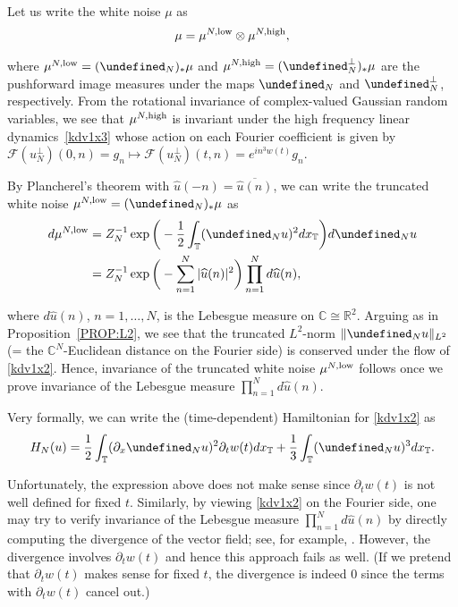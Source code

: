 \documentclass[letterpaper, 11pt,  reqno]{amsart}
\newcommand{\1}{\hspace{0.5mm}\text{I}\hspace{0.5mm}}
\newcommand{\noi}{\noindent}
\newcommand{\R}{\mathbb{R}}
\newcommand{\C}{\mathbb{C}}
\newcommand{\T}{\mathbb{T}}
\let\P= \undefined
\newcommand{\P}{\mathbf{P}}
\newcommand{\F}{\mathcal{F}}
\newcommand{\low}{\textup{low}}
\newcommand{\high}{\textup{high}}
\newcommand{\ft}{\widehat}
\newcommand{\cj}{\overline}
\newcommand{\dx}{\partial_x}
\newcommand{\dt}{\partial_t}
\numberwithin{equation}{section}
\numberwithin{theorem}{section}
\begin{document}
Let us write the white noise $\mu$ as 
\begin{align}
 \mu 
  =  \mu^{N, \low} \otimes \mu^{N, \high}, 
\label{white1b}
\end{align}

\noi
where $\mu^{N, \low} = (\P_N)_* \mu$
and  $\mu^{N, \high} = (\P_N^\perp)_* \mu$
are the pushforward image
measures under the maps $\P_N$ and $\P_N^\perp$, 
respectively.
From the rotational invariance of complex-valued Gaussian random variables, we see that 
 $\mu^{N, \high}$ is invariant
under the high frequency linear dynamics~\eqref{kdv1x3}
whose action on each Fourier coefficient is given by 
$\F(u_N^\perp)(0, n) = g_n \mapsto  \F(u_N^\perp)(t, n) = e^{i n^3 w(t)}g_n$.


By Plancherel's theorem with $\ft u(-n) = \cj{\ft u(n)}$, 
we can write  the truncated white noise $\mu^{N, \low} = (\P_N)_*\mu$ as
\begin{align*}
d\mu^{N, \low}
& = Z_N^{-1}
\exp\bigg(- \frac 12 \int_\T (\P_N u)^2 dx_\T\bigg) d\P_N u\\
& = Z_N^{-1}
\exp\bigg(- \sum_{n = 1}^N |\ft u(n)|^2 \bigg) \prod_{n = 1}^N d\ft u(n), 
\end{align*}

\noi
where $d\ft u(n)$, $n = 1, \dots, N$, is the Lebesgue measure on $\C\cong \R^2$.
Arguing as in 
Proposition~\ref{PROP:L2}, 
we see that the truncated $L^2$-norm
$\|\P_N u\|_{L^2}$ 
(= the $\C^N$-Euclidean distance on the Fourier side)
is conserved under the flow of \eqref{kdv1x2}.
Hence, invariance of the truncated white noise 
$\mu^{N, \low}$ follows once we prove invariance of the Lebesgue measure
$\prod_{n = 1}^N d\ft u(n)$.

Very formally, we can write the (time-dependent) Hamiltonian for \eqref{kdv1x2}
as 
\begin{align*}
H_N(u) = \frac 12 \int_\T (\dx \P_N u)^2\dt w (t) dx_\T
+ \frac 13 \int_\T (\P_N u)^3dx_\T.
\end{align*}

\noi
Unfortunately, the expression above does not make sense
since $\dt w (t)$ is not well defined for fixed $t$. 
Similarly, by viewing \eqref{kdv1x2} on the Fourier side, 
one may try to verify invariance of the Lebesgue measure
$\prod_{n = 1}^N d\ft u(n)$ by directly computing
the divergence of the vector field; see, for example, 
\cite[Lemma 4.1]{NORS}.
However, the divergence involves $\dt w(t)$
and hence this approach fails as well.
(If we pretend that $\dt w(t)$ makes sense for fixed $t$, 
the divergence is indeed $0$ since the terms
with $\dt w(t)$ cancel out.)
\end{document}
